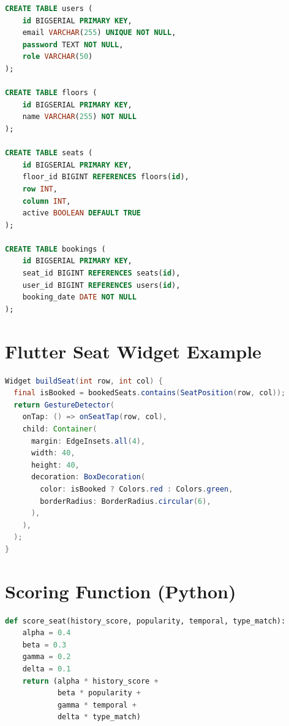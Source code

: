 \documentclass[12pt,a4paper]{report} %
\begin{document}
\begin{lstlisting}[language=SQL, caption=Database Schema, label=lst:sql-schema]
CREATE TABLE users (
    id BIGSERIAL PRIMARY KEY,
    email VARCHAR(255) UNIQUE NOT NULL,
    password TEXT NOT NULL,
    role VARCHAR(50)
);

CREATE TABLE floors (
    id BIGSERIAL PRIMARY KEY,
    name VARCHAR(255) NOT NULL
);

CREATE TABLE seats (
    id BIGSERIAL PRIMARY KEY,
    floor_id BIGINT REFERENCES floors(id),
    row INT,
    column INT,
    active BOOLEAN DEFAULT TRUE
);

CREATE TABLE bookings (
    id BIGSERIAL PRIMARY KEY,
    seat_id BIGINT REFERENCES seats(id),
    user_id BIGINT REFERENCES users(id),
    booking_date DATE NOT NULL
);
\end{lstlisting}

\chapter{Flutter Seat Widget Example}
\label{appendix:flutter}

\begin{lstlisting}[language=Java, caption=Seat Booking Widget (Flutter), label=lst:flutter-ui]
Widget buildSeat(int row, int col) {
  final isBooked = bookedSeats.contains(SeatPosition(row, col));
  return GestureDetector(
    onTap: () => onSeatTap(row, col),
    child: Container(
      margin: EdgeInsets.all(4),
      width: 40,
      height: 40,
      decoration: BoxDecoration(
        color: isBooked ? Colors.red : Colors.green,
        borderRadius: BorderRadius.circular(6),
      ),
    ),
  );
}
\end{lstlisting}

\chapter{Scoring Function (Python)}
\label{appendix:scoring}

\begin{lstlisting}[language=Python, caption=Seat Scoring Function (Python), label=lst:scoring-function]
def score_seat(history_score, popularity, temporal, type_match):
    alpha = 0.4
    beta = 0.3
    gamma = 0.2
    delta = 0.1
    return (alpha * history_score +
            beta * popularity +
            gamma * temporal +
            delta * type_match)
\end{lstlisting}



\end{document}
